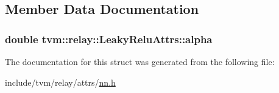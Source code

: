 \subsection{Member Data Documentation}
\subsubsection[{\texorpdfstring{alpha}{alpha}}]{\setlength{\rightskip}{0pt plus 5cm}double tvm\+::relay\+::\+Leaky\+Relu\+Attrs\+::alpha}\hypertarget{structtvm_1_1relay_1_1LeakyReluAttrs_a78576f4cbcc1139b98c4fc00b99d0e07}{}\label{structtvm_1_1relay_1_1LeakyReluAttrs_a78576f4cbcc1139b98c4fc00b99d0e07}


The documentation for this struct was generated from the following file\+:\begin{DoxyCompactItemize}
\item 
include/tvm/relay/attrs/\hyperlink{include_2tvm_2relay_2attrs_2nn_8h}{nn.\+h}\end{DoxyCompactItemize}
